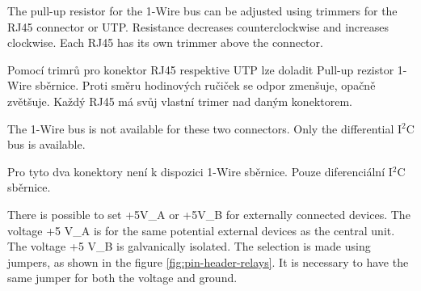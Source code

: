 \begin{Czech}
\end{Czech}


\begin{English}
The pull-up resistor for the 1-Wire bus can be adjusted using trimmers for the RJ45 connector or UTP. Resistance decreases counterclockwise and increases clockwise. Each RJ45 has its own trimmer above the connector.
\end{English}

\begin{Czech}
Pomocí trimrů pro konektor RJ45 respektive UTP lze doladit Pull-up rezistor 1-Wire sběrnice. Proti směru hodinových ručiček se odpor zmenšuje, opačně zvětšuje. Každý RJ45 má svůj vlastní trimer nad daným konektorem.
\end{Czech}


\begin{English}
\end{English}

\begin{Czech}
\end{Czech}


\begin{English}
The 1-Wire bus is not available for these two connectors. Only the differential I$^2$C bus is available.
\end{English}

\begin{Czech}
Pro tyto dva konektory není k dispozici 1-Wire sběrnice. Pouze diferenciální I$^2$C sběrnice.
\end{Czech}


\begin{English}
\end{English}

\begin{Czech}
\end{Czech}


\begin{English}
There is possible to set +5V\_A or +5V\_B for externally connected devices.
The voltage +5 V\_A is for the same potential external devices as the central unit. The voltage +5 V\_B is galvanically isolated. The selection is made using jumpers, as shown in the figure \ref{fig:pin-header-relays}. It is necessary to have the same jumper for both the voltage and ground.
\end{English}

